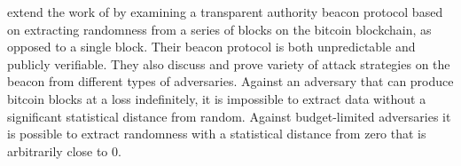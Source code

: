 \citet{bentov2016bitcoin} extend the work of \citet{bonneau2015bitcoin} by examining a transparent authority beacon protocol based on extracting randomness from a series of blocks on the bitcoin blockchain, as opposed to a single block.
Their beacon protocol is both unpredictable and publicly verifiable.
They also discuss and prove variety of attack strategies on the beacon from different types of adversaries.
Against an adversary that can produce bitcoin blocks at a loss indefinitely, it is impossible to extract data without a significant statistical distance from random.
Against budget-limited adversaries it is possible to extract randomness with a statistical distance from zero that is arbitrarily close to 0.
